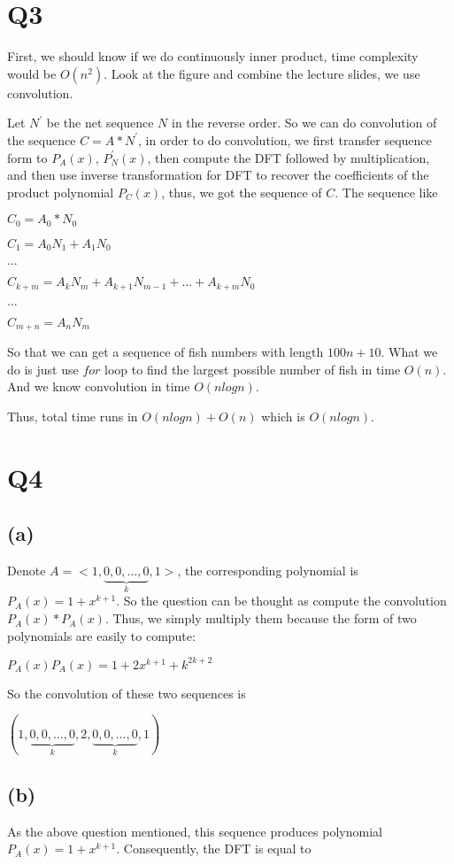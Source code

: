 \documentclass[a4paper]{article}
\begin{document}
	\section*{Q3}
	First, we should know if we do continuously inner product, time complexity would be $O(n^2)$.
	Look at the figure and combine the lecture slides, we use convolution.
	
	Let $N^{'}$ be the net sequence $N$ in the reverse order. So we can do convolution of the sequence $C = A * N^{'}$, in order to do convolution, we first transfer sequence form to $P_A(x)$, $P_N^{'}(x)$, then compute the DFT followed by multiplication, and then use inverse transformation for DFT to recover the coefficients of the product polynomial $P_C(x)$, thus, we got the sequence of $C$. The sequence like 
	
	$C_0 = A_0*N_0$
	
	$C_1 = A_0N_1+A_1N_0$
	
	$ \dots $
	
	$C_{k+m}=A_kN_m+A_{k+1}N_{m-1}+\dots+A_{k+m}N_0$ 
	
	$\dots$ 
	
	$C_{m+n}=A_nN_m$
	
	So that we can get a sequence of fish numbers with length $100n+10$. What we do is just use $for$ loop to find the largest possible number of fish in time $O(n)$. And we know convolution in time $O(nlog n)$.
	
	Thus, total time runs in $O(nlog n) + O(n)$ which is $O(nlog n)$. 
	
	\section*{Q4}
	\subsection*{(a)}
	Denote $A = <1,\underbrace{0,0,\dots,0}_{k},1>$, the corresponding polynomial is $P_A(x) = 1 + x^{k+1}$. So the question can be thought as compute the convolution $P_A(x) * P_A(x)$. Thus, we simply multiply them because the form of two polynomials are easily to compute:
	
	$P_A(x)P_A(x)=1+2x^{k+1}+k^{2k+2}$
	
	So the convolution of these two sequences is 
	
	$(1,\underbrace{0,0,\dots,0}_{k},2,\underbrace{0,0,\dots,0}_{k},1)$
	\subsection*{(b)}
	As the above question mentioned, this sequence produces polynomial $P_A(x) = 1 + x^{k+1}$.
	Consequently, the DFT is equal to
	
\end{document}
